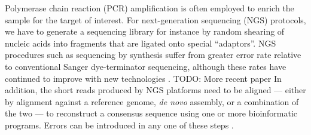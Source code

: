 \documentclass[10pt]{article}
\begin{document}
Polymerase chain reaction (PCR) amplification is often employed to enrich the sample for the target of interest.
For next-generation sequencing (NGS) protocols, we have to generate a sequencing library for instance by random shearing of nucleic acids into fragments that are ligated onto special ``adaptors''.
NGS procedures such as sequencing by synthesis suffer from greater error rate relative to conventional Sanger dye-terminator sequencing, although these rates have continued to improve with new technologies \citep{fullerChallengesSequencingSynthesis2009}. TODO: More recent paper
In addition, the short reads produced by NGS platforms need to be aligned --- either by alignment against a reference genome, \emph{de novo} assembly, or a combination of the two --- to reconstruct a consensus sequence using one or more bioinformatic programs.
Errors can be introduced in any one of these steps \citep{beerenwinkelUltradeepSequencingAnalysis2011, oraweAccountingUncertaintyDNA2015}.
\end{document}
